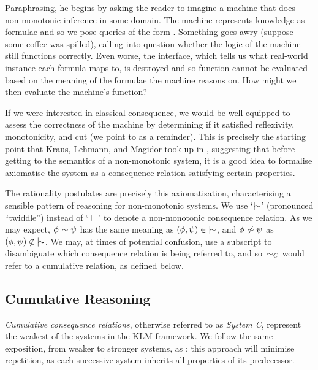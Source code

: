 Paraphrasing, he begins by asking the reader to imagine a machine that does non-monotonic inference in some domain. The machine represents knowledge
as formulae and so we pose queries of the form . Something goes awry (suppose some
coffee was spilled), calling into question whether the logic of the machine still functions correctly. Even worse, the interface, which tells
us what real-world instance each formula maps to, is destroyed and so function cannot be evaluated based on the meaning of the formulae the
machine reasons on. How might we then evaluate the machine's function?

If we were interested in classical consequence, we would be well-equipped to assess the correctness of the machine by determining if it
satisfied reflexivity, monotonicity, and cut (we point to  as a reminder). This is precisely the starting
point that Kraus, Lehmann, and Magidor took up in \cite{kraus1990nonmonotonic}, suggesting that before getting to the semantics of a non-monotonic
system, it is a good idea to formalise axiomatise the system as a consequence relation satisfying certain properties.

The rationality postulates are precisely this axiomatisation, characterising a sensible pattern of reasoning for non-monotonic systems. We use
`$\twiddle$' (pronounced ``twiddle'') instead of `$\vdash$' to denote a non-monotonic consequence relation. As we may expect, $\phi \twiddle
\psi$ has the same meaning as $(\phi, \psi) \in \; \twiddle$, and $\phi \ntwiddle \psi$ as $(\phi, \psi)\not \in \; \twiddle$. We may, at
times of potential confusion, use a subscript to disambiguate which consequence relation is being referred to, and so $\twiddle_{C}$ would
refer to a cumulative relation, as defined below.


\subsection{Cumulative Reasoning}
\label{subsection:system-c}

\textit{Cumulative consequence relations}, otherwise referred to as \textit{System C}, represent the weakest of the systems in the KLM framework.
We follow the same exposition, from weaker to stronger systems, as \cite{kraus1990nonmonotonic}: this approach will minimise repetition, as
each successive system inherits all properties of its predecessor.

